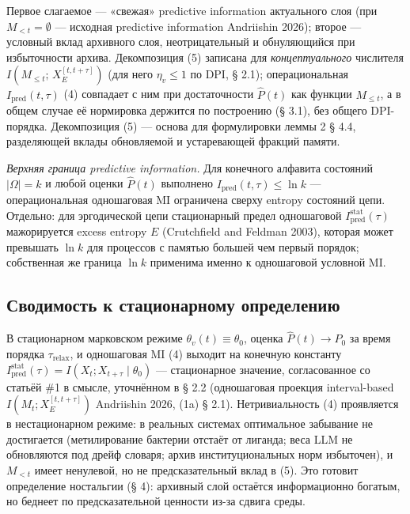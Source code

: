 \documentclass[pdflatex,sn-mathphys-ay]{sn-jnl}
\providecommand{\lt}{<}\providecommand{\gt}{>}
\begin{document}
Первое слагаемое --- «свежая» predictive information актуального слоя (при \(M_{\lt t} = \emptyset\) --- исходная predictive information Andriishin 2026); второе --- условный вклад архивного слоя, неотрицательный и обнуляющийся при избыточности архива. Декомпозиция (5) записана для \emph{концептуального} числителя \(I(M_{\le t};\, X_E^{[t, t+\tau]})\) (для него \(\eta_v \le 1\) по DPI, § 2.1); операциональная \(I_{\text{pred}}(t,\tau)\) (4) совпадает с ним при достаточности \(\hat P(t)\) как функции \(M_{\le t}\), а в общем случае её нормировка держится по построению (§ 3.1), без общего DPI-порядка. Декомпозиция (5) --- основа для формулировки леммы 2 § 4.4, разделяющей вклады обновляемой и устаревающей фракций памяти.



\emph{Верхняя граница predictive information.} Для конечного алфавита состояний \(|\Omega| = k\) и любой оценки \(\hat P(t)\) выполнено \(I_{\text{pred}}(t, \tau) \le \ln k\) --- операциональная одношаговая MI ограничена сверху entropy состояний цепи. Отдельно: для эргодической цепи стационарный предел одношаговой \(I_{\text{pred}}^{\text{stat}}(\tau)\) мажорируется excess entropy \(E\) (Crutchfield and Feldman 2003), которая может превышать \(\ln k\) для процессов с памятью большей чем первый порядок; собственная же граница \(\ln k\) применима именно к одношаговой условной MI.



\subsection{Сводимость к стационарному определению}\label{ux441ux432ux43eux434ux438ux43cux43eux441ux442ux44c-ux43a-ux441ux442ux430ux446ux438ux43eux43dux430ux440ux43dux43eux43cux443-ux43eux43fux440ux435ux434ux435ux43bux435ux43dux438ux44e}



В стационарном марковском режиме \(\theta_v(t) \equiv \theta_0\), оценка \(\hat P(t) \to P_0\) за время порядка \(\tau_{\text{relax}}\), и одношаговая MI (4) выходит на конечную константу \(I_{\text{pred}}^{\text{stat}}(\tau) = I(X_t; X_{t+\tau} \mid \theta_0)\) --- стационарное значение, согласованное со статьёй \#1 в смысле, уточнённом в § 2.2 (одношаговая проекция interval-based \(I(M_t; X_E^{[t,t+\tau]})\) Andriishin 2026, (1a) § 2.1). Нетривиальность (4) проявляется в нестационарном режиме: в реальных системах оптимальное забывание не достигается (метилирование бактерии отстаёт от лиганда; веса LLM не обновляются под дрейф словаря; архив институциональных норм избыточен), и \(M_{\lt t}\) имеет ненулевой, но не предсказательный вклад в (5). Это готовит определение ностальгии (§ 4): архивный слой остаётся информационно богатым, но беднеет по предсказательной ценности из-за сдвига среды.
\end{document}
